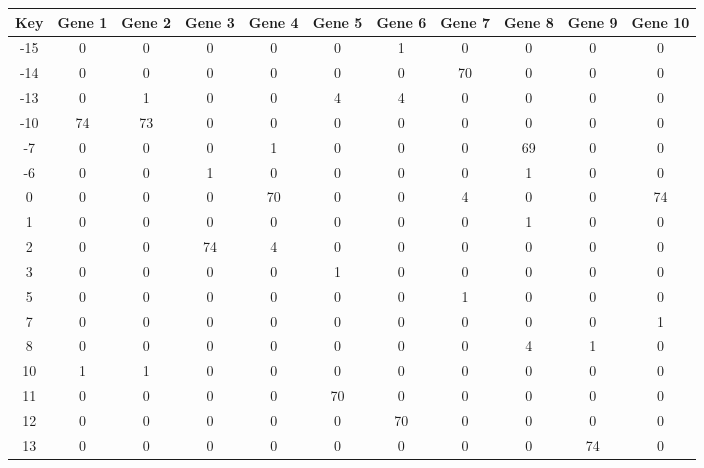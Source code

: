 \begin{tabular}{|c|c|c|c|c|c|c|c|c|c|c|}
\hline
Key & Gene 1 & Gene 2 & Gene 3 & Gene 4 & Gene 5 & Gene 6 & Gene 7 & Gene 8 & Gene 9 & Gene 10 \\
\hline
-15 & 0 & 0 & 0 & 0 & 0 & 1 & 0 & 0 & 0 & 0 \\
-14 & 0 & 0 & 0 & 0 & 0 & 0 & 70 & 0 & 0 & 0 \\
-13 & 0 & 1 & 0 & 0 & 4 & 4 & 0 & 0 & 0 & 0 \\
-10 & 74 & 73 & 0 & 0 & 0 & 0 & 0 & 0 & 0 & 0 \\
-7 & 0 & 0 & 0 & 1 & 0 & 0 & 0 & 69 & 0 & 0 \\
-6 & 0 & 0 & 1 & 0 & 0 & 0 & 0 & 1 & 0 & 0 \\
0 & 0 & 0 & 0 & 70 & 0 & 0 & 4 & 0 & 0 & 74 \\
1 & 0 & 0 & 0 & 0 & 0 & 0 & 0 & 1 & 0 & 0 \\
2 & 0 & 0 & 74 & 4 & 0 & 0 & 0 & 0 & 0 & 0 \\
3 & 0 & 0 & 0 & 0 & 1 & 0 & 0 & 0 & 0 & 0 \\
5 & 0 & 0 & 0 & 0 & 0 & 0 & 1 & 0 & 0 & 0 \\
7 & 0 & 0 & 0 & 0 & 0 & 0 & 0 & 0 & 0 & 1 \\
8 & 0 & 0 & 0 & 0 & 0 & 0 & 0 & 4 & 1 & 0 \\
10 & 1 & 1 & 0 & 0 & 0 & 0 & 0 & 0 & 0 & 0 \\
11 & 0 & 0 & 0 & 0 & 70 & 0 & 0 & 0 & 0 & 0 \\
12 & 0 & 0 & 0 & 0 & 0 & 70 & 0 & 0 & 0 & 0 \\
13 & 0 & 0 & 0 & 0 & 0 & 0 & 0 & 0 & 74 & 0 \\
\hline
\end{tabular}